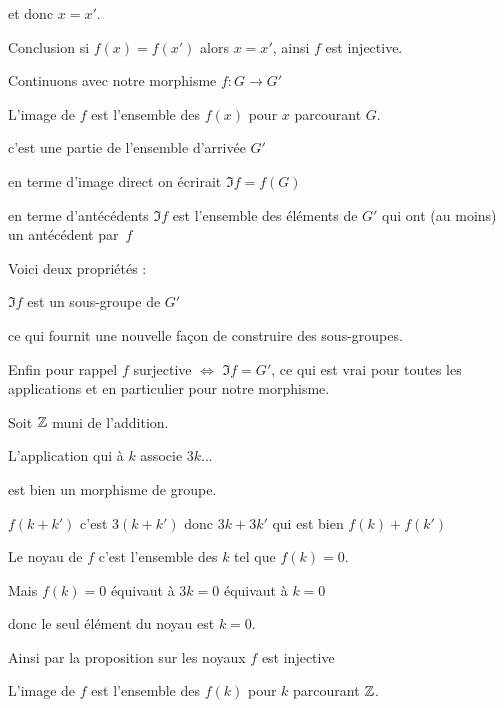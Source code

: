 et donc $x=x'$. 

Conclusion si $f(x)=f(x')$ alors $x=x'$, ainsi $f$ est injective.

\diapo


Continuons avec notre morphisme $f: G \longrightarrow G'$

L'image de $f$ est l'ensemble des $f(x)$ pour $x$ parcourant $G$.

\change

c'est une partie de l'ensemble d'arrivée $G'$

en terme d'image direct on écrirait $\Im f = f(G)$

en terme d'antécédents  $\Im f$ est l'ensemble 
des éléments de $G'$ qui ont (au moins) un antécédent par~$f$

\change

Voici deux propriétés :

$\Im f$ est un sous-groupe de $G'$

ce qui fournit une nouvelle façon de construire des sous-groupes.

Enfin pour rappel $f$ surjective $\iff$ $\Im f = G'$, 
ce qui est vrai pour toutes les applications et en particulier pour notre morphisme.



\diapo

Soit $\mathbb{Z}$ muni de l'addition.

L'application qui à $k$ associe $3k$...

\change

est bien un morphisme de groupe.

\change

  $f(k+k')$ c'est $3(k+k')$ donc $3k + 3k'$ qui est bien $f(k)+f(k')$

\change

Le noyau de $f$ c'est l'ensemble des $k$ tel que $f(k)=0$.

\change

Mais  $f(k)=0$ équivaut à $3k=0$ équivaut à $k=0$

donc le seul élément du noyau est $k=0$.

\change

Ainsi par la proposition sur les noyaux $f$ est injective

\change

L'image de $f$ est l'ensemble des $f(k)$ pour $k$ parcourant $\mathbb{Z}$.

